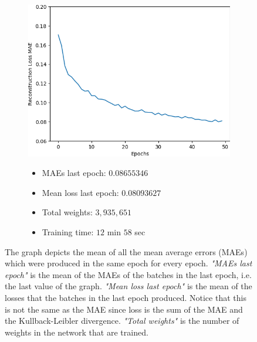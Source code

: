 \begin{figure}[H]
    \centering
    \begin{subfigure}{.5\textwidth}
        \centering
        \includegraphics[width=\textwidth]
        {images/figures/experiments_architecture/mae_graphKernel3adjusted2x2x256_dim1024.png}
    \end{subfigure}%
    \begin{subfigure}{.5\textwidth}
      \begin{itemize}
          \item MAEs last epoch: $0.08655346$
          \item Mean loss last epoch: $0.08093627$
          \item Total weights: $3,935,651$
          \item Training time: $12$ min $58$ sec
      \end{itemize}
    \end{subfigure}
    \caption{The graph depicts the mean of all the mean average errors (MAEs)
    which were produced in the same epoch for every epoch. \textit{"MAEs last epoch"} is the mean of the MAEs
    of the batches in the last epoch, i.e. the last value of the graph. \textit{"Mean loss last epoch"} is the mean
    of the losses that the batches in the last epoch produced. Notice that this is not the same as the MAE since
    loss is the sum of the MAE and the Kullback-Leibler divergence. \textit{"Total weights"} is the number
    of weights in the network that are trained.}
\end{figure}

